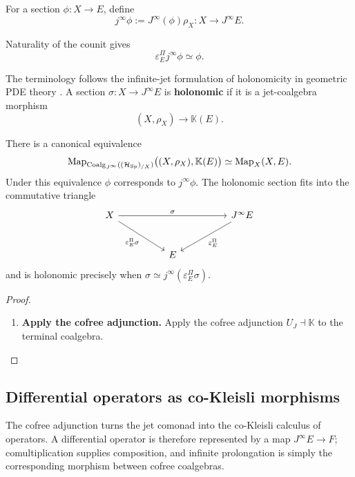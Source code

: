 \begin{definition}
For a section \(\phi:X\to E\), define
\[
  j^\infty\phi
  :=
  J^\infty(\phi)\rho_X:
  X\to J^\infty E.
\]
\end{definition}

Naturality of the counit gives
\[
  \varepsilon^\Pi_Ej^\infty\phi\simeq\phi.
\]

\begin{definition}
The terminology follows the infinite-jet formulation of holonomicity in
geometric PDE theory \cite{KhavkineSchreiber2017}. A section \(\sigma:X\to J^\infty E\) is \textbf{holonomic} if it is a
jet-coalgebra morphism
\[
  (X,\rho_X)\longrightarrow\mathbb K(E).
\]
\end{definition}

\begin{theorem}
\label{thm:holonomic-recognition}
There is a canonical equivalence
\[
  \operatorname{Map}_{\operatorname{Coalg}_{J^\infty}((\mathcal H_{\operatorname{Sp}})_{/X})}
  \bigl((X,\rho_X),\mathbb K(E)\bigr)
  \simeq
  \operatorname{Map}_X(X,E).
\]
Under this equivalence \(\phi\) corresponds to \(j^\infty\phi\). The
holonomic section fits into the commutative triangle
\[
\begin{tikzcd}[column sep=huge,row sep=large]
X \ar[rr,"\sigma"] \ar[dr,"\varepsilon^\Pi_E\sigma"']
&& J^\infty E \ar[dl,"\varepsilon^\Pi_E"]\\
& E &
\end{tikzcd}
\]
and is holonomic precisely when
\(\sigma\simeq j^\infty(\varepsilon^\Pi_E\sigma)\).
\end{theorem}

\begin{proof}
\leavevmode
\begin{enumerate}[label=\textup{(\arabic*)}]
    \item \textbf{Apply the cofree adjunction.}
Apply the cofree adjunction \(U_J\dashv\mathbb K\) to the terminal coalgebra.
\end{enumerate}
\end{proof}

\subsection{Differential operators as co-Kleisli morphisms}
\label{sec:differential-operators}

The cofree adjunction turns the jet comonad into the co-Kleisli calculus of
operators. A differential operator is therefore represented by a map
\(J^\infty E\to F\); comultiplication supplies composition, and infinite
prolongation is simply the corresponding morphism between cofree
coalgebras.

